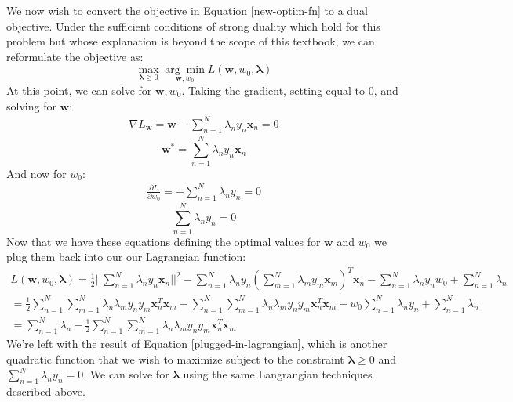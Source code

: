 We now wish to convert the objective in Equation \ref{new-optim-fn} to a dual objective. Under the sufficient conditions of strong duality which hold for this problem but whose explanation is beyond the scope of this textbook, we can reformulate the objective as:
\begin{equation} \label{dual-objective}
	\max_{\boldsymbol{\lambda} \geq 0} \underset{\textbf{w}, w_{0}}{\arg\min} L(\textbf{w}, w_{0}, \boldsymbol{\lambda})
\end{equation}
At this point, we can solve for $\textbf{w}, w_{0}$. Taking the gradient, setting equal to 0, and solving for $\textbf{w}$:
\begin{align*}
	\nabla L_{\textbf{w}} = \textbf{w} - \sum_{n=1}^{N} \lambda_{n} y_{n} \textbf{x}_{n} = 0
\end{align*}
\begin{equation} \label{solve-for-w}
	\textbf{w}^{*} = \sum_{n=1}^{N} \lambda_{n} y_{n} \textbf{x}_{n}
\end{equation}
And now for $w_{0}$:
\begin{align*}
	\frac{\partial L}{\partial w_{0}} = - \sum_{n=1}^{N} \lambda_{n} y_{n} = 0
\end{align*}
\begin{equation} \label{solve-for-w0}
	\sum_{n=1}^{N} \lambda_{n} y_{n} = 0
\end{equation}
Now that we have these equations defining the optimal values for $\textbf{w}$ and $w_{0}$ we plug them back into our our Lagrangian function:
\begin{equation} \label{plugged-in-lagrangian}
	\begin{aligned}
		L(\textbf{w}, w_{0}, \boldsymbol{\lambda}) = \frac{1}{2} || \sum_{n=1}^{N} \lambda_{n} y_{n} \textbf{x}_{n} ||^{2} - \sum_{n=1}^{N} \lambda_{n} y_{n} (\sum_{m=1}^{N} \lambda_{m} y_{m} \textbf{x}_{m})^{T} \textbf{x}_{n} - \sum_{n=1}^{N} \lambda_{n} y_{n} w_{0} + \sum_{n=1}^{N} \lambda_{n} \\
		= \frac{1}{2} \sum_{n=1}^{N} \sum_{m=1}^{N} \lambda_{n} \lambda_{m} y_{n} y_{m} \textbf{x}_{n}^{T} \textbf{x}_{m} - \sum_{n=1}^{N} \sum_{m=1}^{N} \lambda_{n} \lambda_{m} y_{n} y_{m} \textbf{x}_{n}^{T} \textbf{x}_{m} - w_{0} \sum_{n=1}^{N} \lambda_{n} y_{n} + \sum_{n=1}^{N} \lambda_{n} \\
		= \sum_{n=1}^{N} \lambda_{n} - \frac{1}{2} \sum_{n=1}^{N} \sum_{m=1}^{N} \lambda_{n} \lambda_{m} y_{n} y_{m} \textbf{x}_{n}^{T} \textbf{x}_{m}
	\end{aligned}
\end{equation}
We're left with the result of Equation \ref{plugged-in-lagrangian}, which is another quadratic function that we wish to maximize subject to the constraint $\boldsymbol{\lambda} \geq 0$ and $\sum_{n=1}^{N} \lambda_{n} y_{n} = 0$. We can solve for $\boldsymbol{\lambda}$ using the same Langrangian techniques described above.

